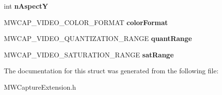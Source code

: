 \begin{DoxyCompactItemize}
\item 
\hypertarget{struct__MWCAP__VIDEO__CONNECTION__FORMAT_a31e8682848d5af601e58fcada8621f72}{int {\bfseries n\-Aspect\-Y}}\label{struct__MWCAP__VIDEO__CONNECTION__FORMAT_a31e8682848d5af601e58fcada8621f72}

\item 
\hypertarget{struct__MWCAP__VIDEO__CONNECTION__FORMAT_af7527d91510e34d1dcce3269e9078959}{M\-W\-C\-A\-P\-\_\-\-V\-I\-D\-E\-O\-\_\-\-C\-O\-L\-O\-R\-\_\-\-F\-O\-R\-M\-A\-T {\bfseries color\-Format}}\label{struct__MWCAP__VIDEO__CONNECTION__FORMAT_af7527d91510e34d1dcce3269e9078959}

\item 
\hypertarget{struct__MWCAP__VIDEO__CONNECTION__FORMAT_a8c770f2f616c8686b3485f4b31a92f59}{M\-W\-C\-A\-P\-\_\-\-V\-I\-D\-E\-O\-\_\-\-Q\-U\-A\-N\-T\-I\-Z\-A\-T\-I\-O\-N\-\_\-\-R\-A\-N\-G\-E {\bfseries quant\-Range}}\label{struct__MWCAP__VIDEO__CONNECTION__FORMAT_a8c770f2f616c8686b3485f4b31a92f59}

\item 
\hypertarget{struct__MWCAP__VIDEO__CONNECTION__FORMAT_a443dc46c5d799695c75b3e1c8196e7aa}{M\-W\-C\-A\-P\-\_\-\-V\-I\-D\-E\-O\-\_\-\-S\-A\-T\-U\-R\-A\-T\-I\-O\-N\-\_\-\-R\-A\-N\-G\-E {\bfseries sat\-Range}}\label{struct__MWCAP__VIDEO__CONNECTION__FORMAT_a443dc46c5d799695c75b3e1c8196e7aa}

\end{DoxyCompactItemize}


The documentation for this struct was generated from the following file\-:\begin{DoxyCompactItemize}
\item 
M\-W\-Capture\-Extension.\-h\end{DoxyCompactItemize}
